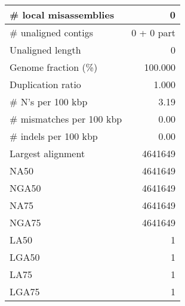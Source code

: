 \documentclass[12pt,a4paper]{article}
\begin{document}
\begin{table}[ht]
\begin{center}
\begin{tabular}{|l*{1}{|r}|}
\# local misassemblies & 0 \\ \hline
\# unaligned contigs & 0 + 0 part \\ \hline
Unaligned length & 0 \\ \hline
Genome fraction (\%) & 100.000 \\ \hline
Duplication ratio & 1.000 \\ \hline
\# N's per 100 kbp & 3.19 \\ \hline
\# mismatches per 100 kbp & 0.00 \\ \hline
\# indels per 100 kbp & 0.00 \\ \hline
Largest alignment & 4641649 \\ \hline
NA50 & 4641649 \\ \hline
NGA50 & 4641649 \\ \hline
NA75 & 4641649 \\ \hline
NGA75 & 4641649 \\ \hline
LA50 & 1 \\ \hline
LGA50 & 1 \\ \hline
LA75 & 1 \\ \hline
LGA75 & 1 \\ \hline
\end{tabular}
\end{center}
\end{table}
\end{document}
